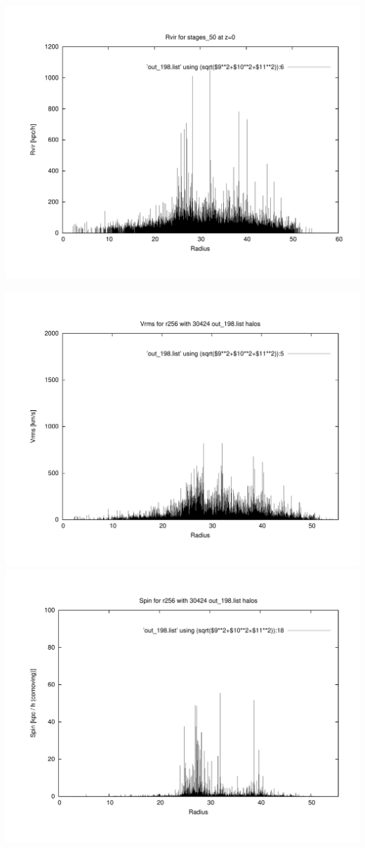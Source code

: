 \includegraphics[scale=0.3]{r256/stages_50/plot_rvir_z0.pdf}

\includegraphics[scale=0.3]{r256/stages_50/plot_Vrms_out_198.pdf}
\includegraphics[scale=0.3]{r256/stages_50/plot_spin_out_198.pdf}

